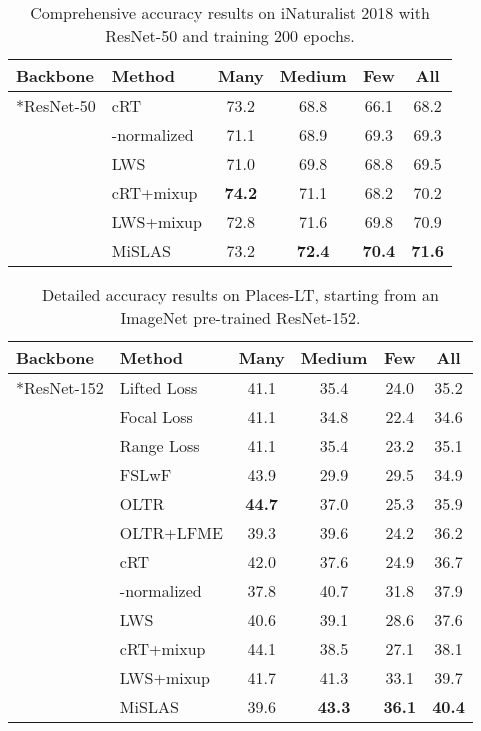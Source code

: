 \documentclass[final]{cvpr}
\begin{document}
	\begin{table*}[h]
		\setlength{\tabcolsep}{20.5pt}
		\centering
		\begin{tabular}{l|l|cccc}
			\toprule[1.5pt]
			{\textbf{Backbone}}		& {\textbf{Method}}	 & Many & Medium & Few & All	\\ 
			\midrule
			{\multirow{6.5}*{ResNet-50}} & cRT	& 73.2 & 68.8 & 66.1 & 68.2\\
			&-normalized& 71.1 & 68.9 & 69.3 & 69.3\\
			&LWS& 71.0 & 69.8 & 68.8 & 69.5\\
			\cmidrule(lr){2-6}
			& cRT+mixup& \textbf{74.2}  & 71.1  &  68.2  & 70.2   \\& LWS+mixup& 72.8 & 71.6  & 69.8  & 70.9    \\& MiSLAS & 73.2  & \textbf{72.4}  &  \textbf{70.4} & \textbf{71.6}    \\\bottomrule[1.5pt]     
		\end{tabular}
		\caption{Comprehensive accuracy results on iNaturalist 2018 with ResNet-50 and training 200 epochs.}
		\vspace{-5pt}
		\label{tab:inua_more}
	\end{table*}
	
	
	\begin{table*}[h]
		\setlength{\tabcolsep}{20pt}
		\centering
		\begin{tabular}{l|l|cccc}
			\toprule[1.5pt]
			{\textbf{Backbone}}	& {\textbf{Method}}	 & Many & Medium & Few & All	\\ 
			\midrule
			{\multirow{13}*{ResNet-152}} &Lifted Loss& 41.1 &35.4 &24.0 & 35.2 \\
			&Focal Loss &41.1 &34.8 &22.4 &34.6 \\
			&Range Loss &41.1 &35.4 &23.2 &35.1 \\
			&FSLwF &43.9 &29.9& 29.5 &34.9 \\
			&OLTR &\textbf{44.7} &37.0 &25.3 &35.9  \\
			\cmidrule(lr){2-6}
			&OLTR+LFME &39.3 &39.6 &24.2 &36.2  \\
			&cRT &42.0 &37.6 &24.9 &36.7\\
			&-normalized &37.8 &40.7 &31.8 &37.9\\
			&LWS &40.6 &39.1 &28.6 &37.6 \\
			\cmidrule(lr){2-6}
			&cRT+mixup& 44.1 & 38.5  &  27.1  & 38.1    \\&LWS+mixup& 41.7  & 41.3  &  33.1  & 39.7    \\&MiSLAS & 39.6 & \textbf{43.3} & \textbf{36.1}   & \textbf{40.4}    \\\bottomrule[1.5pt]     
		\end{tabular}
		\caption{Detailed accuracy results on Places-LT, starting from an ImageNet pre-trained ResNet-152.}
		\vspace{-5pt}
		\label{tab:place_more}
	\end{table*}
	\clearpage
\end{document}
